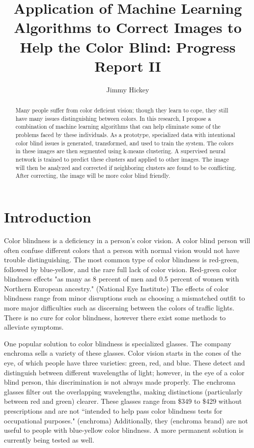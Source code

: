 \documentclass[12pt]{article}
\title{
Application of Machine Learning Algorithms to Correct Images to Help the Color Blind: Progress Report II
}
\author{Jimmy Hickey}
\begin{document}
\maketitle
\doublespacing

\begin{abstract}
Many people suffer from color deficient vision; though they learn to cope, they still have many issues distinguishing between colors. In this research, I propose a combination of machine learning algorithms that can help eliminate some of the problems faced by these individuals. As a prototype, specialized data with intentional color blind issues is generated, transformed, and used to train the system. The colors in these images are then segmented using k-means clustering. A supervised neural network is trained to predict these clusters and applied to other images. The image will then be analyzed and corrected if neighboring clusters are found to be conflicting. After correcting, the image will be more color blind friendly.

\end{abstract}

\section{Introduction}

Color blindness is a deficiency in a person's color vision. A color blind person will often confuse different colors that a person with normal vision would not have trouble distinguishing. The most common type of color blindness is red-green, followed by blue-yellow, and the rare full lack of color vision. Red-green color blindness effects "as many as 8 percent of men and 0.5 percent of women with Northern European ancestry." (National Eye Institute) The effects of color blindness range from minor disruptions such as choosing a mismatched outfit to more major difficulties such as discerning between the colors of traffic lights.
There is no cure for color blindness, however there exist some methods to alleviate symptoms. 

One popular solution to color blindness is specialized glasses. The company enchroma sells a variety of these glasses. Color vision starts in the cones of the eye, of which people have three varieties: green, red, and blue. These detect and distinguish between different wavelengths of light; however, in the eye of a color blind person, this discrimination is not always made properly. The enchroma glasses filter out the overlapping wavelengths, making distinctions (particularly between red and green) clearer. These glasses range from \$349 to \$429 without prescriptions and are not ``intended to help pass color blindness tests for occupational purposes." (enchroma) Additionally, they (enchroma brand) are not useful to people with blue-yellow color blindness. A more permanent solution is currently being tested as well.
\end{document}
